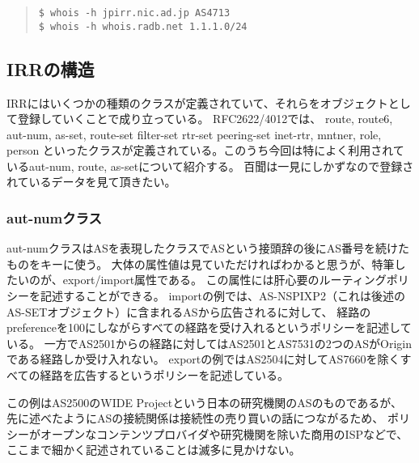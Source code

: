 \begin{quote}
\begin{minilinespace}
\begin{verbatim}
$ whois -h jpirr.nic.ad.jp AS4713
$ whois -h whois.radb.net 1.1.1.0/24
\end{verbatim}
\end{minilinespace}
\end{quote}


\subsection{IRRの構造}

IRRにはいくつかの種類のクラスが定義されていて、それらをオブジェクトとして登録していくことで成り立っている。
RFC2622/4012では、
route, route6, aut-num, as-set, route-set filter-set rtr-set peering-set inet-rtr, mntner, role, person
といったクラスが定義されている。このうち今回は特によく利用されているaut-num, route, as-setについて紹介する。
百聞は一見にしかずなので登録されているデータを見て頂きたい。

\subsubsection{aut-numクラス}
aut-numクラスはASを表現したクラスでASという接頭辞の後にAS番号を続けたものをキーに使う。
大体の属性値は見ていただければわかると思うが、特筆したいのが、export/import属性である。
この属性には肝心要のルーティングポリシーを記述することができる。
importの例では、AS-NSPIXP2（これは後述のAS-SETオブジェクト）に含まれるASから広告されるに対して、
経路のpreferenceを100にしながらすべての経路を受け入れるというポリシーを記述している。
一方でAS2501からの経路に対してはAS2501とAS7531の2つのASがOriginである経路しか受け入れない。
exportの例ではAS2504に対してAS7660を除くすべての経路を広告するというポリシーを記述している。

この例はAS2500のWIDE Projectという日本の研究機関のASのものであるが、
先に述べたようにASの接続関係は接続性の売り買いの話につながるため、
ポリシーがオープンなコンテンツプロバイダや研究機関を除いた商用のISPなどで、
ここまで細かく記述されていることは滅多に見かけない。

